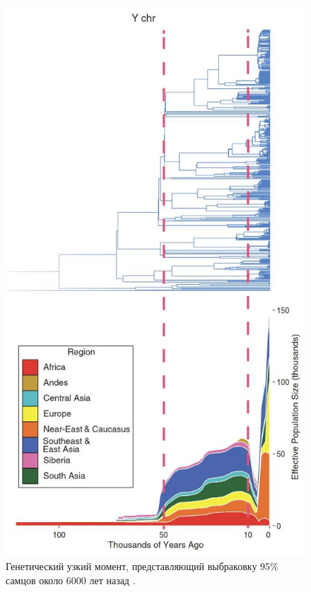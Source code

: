 \documentclass[10pt,twocolumn,letterpaper]{article}
\begin{document}
\begin{figure}[t]
\begin{center}
   \includegraphics[width=1\linewidth]{bottleneck.jpg}
\end{center}
   \caption{Генетический узкий момент, представляющий выбраковку 95\% самцов около 6000 лет назад \cite{62}.}
\label{fig:10}
\label{fig:onecol}
\end{figure}
\end{document}
